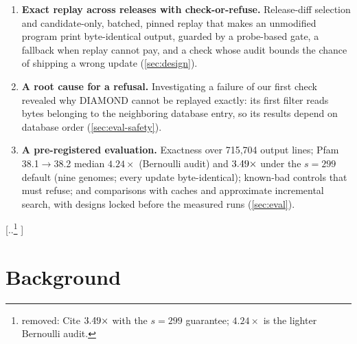 \documentclass[letterpaper,twocolumn,10pt]{article}
\theoremstyle{definition}
\providecommand{\DIFdel}[1]{{\protect\color{red} [..\footnote{removed: #1} ]}} %
\providecommand{\DIFdelbegin}{} %
\providecommand{\DIFdelend}{} %
\providecommand{\DIFscaledelfig}{0.5}
\newlength{\DIFdelgraphicswidth} %
\newlength{\DIFdelgraphicsheight} %
\providecommand{\DIFdelincludegraphics}[2][]{%
\sbox{\DIFdelgraphicsbox}{\DIFOincludegraphics[#1]{#2}}%
\settoboxwidth{\DIFdelgraphicswidth}{\DIFdelgraphicsbox} %
\settoboxtotalheight{\DIFdelgraphicsheight}{\DIFdelgraphicsbox} %
\scalebox{\DIFscaledelfig}{%
\parbox[b]{\DIFdelgraphicswidth}{\usebox{\DIFdelgraphicsbox}\\[-\baselineskip] \rule{\DIFdelgraphicswidth}{0em}}\llap{\resizebox{\DIFdelgraphicswidth}{\DIFdelgraphicsheight}{%
\setlength{\unitlength}{\DIFdelgraphicswidth}%
\begin{picture}(1,1)%
\thicklines\linethickness{2pt} %
{\color[rgb]{1,0,0}\put(0,0){\framebox(1,1){}}}%
{\color[rgb]{1,0,0}\put(0,0){\line( 1,1){1}}}%
{\color[rgb]{1,0,0}\put(0,1){\line(1,-1){1}}}%
\end{picture}%
}\hspace*{3pt}}} %
} %
\DeclareRobustCommand{\DIFdelbegin}{\DIFOdelbegin \let\includegraphics\DIFdelincludegraphics} %
\DeclareRobustCommand{\DIFdelend}{\DIFOaddend \let\includegraphics\DIFOincludegraphics} %
\begin{document}
\begin{enumerate}
  \item \textbf{Exact replay across releases with check\nobreakdash-or\nobreakdash-refuse.} Release\nobreakdash-diff selection and candidate\nobreakdash-only, batched,
  pinned replay that makes an unmodified program print byte\nobreakdash-identical output, guarded by a
  probe\nobreakdash-based gate, a fallback when replay cannot pay, and a check whose audit bounds the chance of shipping a
  wrong update (\cref{sec:design}).
  \item \textbf{A root cause for a refusal.} Investigating a failure of our first check revealed why DIAMOND cannot be
  replayed exactly: its first filter reads bytes belonging to the neighboring database entry, so its results depend
  on database order (\cref{sec:eval-safety}).
  \item \textbf{A pre\nobreakdash-registered evaluation.} Exactness over 715{,}704 output lines; Pfam 38.1$\rightarrow$38.2 median
  $4.24\times$ (Bernoulli audit) and $3.49\times$ under the $s{=}299$ default (nine genomes; every update
  byte\nobreakdash-identical); known\nobreakdash-bad controls that must refuse; and comparisons with caches and approximate incremental search,
  with designs locked before the measured runs (\cref{sec:eval}).
\end{enumerate}
\DIFdelbegin \DIFdel{Cite $3.49\times$ with the $s{=}299$ guarantee; $4.24\times$ is the lighter Bernoulli audit.
}\DIFdelend 

\section{Background}
\label{sec:background}
\end{document}
